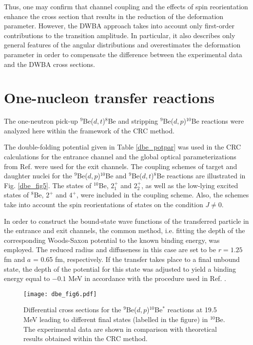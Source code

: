 \documentclass[
12pt, %
oneside, %
english, %
onehalfspacing, %
onehalfspacing, %
headsepline, %
]{MastersDoctoralThesis} %
\begin{document}
Thus, one may confirm that channel coupling and the effects of spin reorientation enhance the cross section that results in the reduction of the deformation parameter. However, the DWBA approach takes into account only first-order contributions to the transition amplitude. In particular, it also describes only general features of the angular distributions and overestimates the deformation parameter in order to compensate the difference between the experimental data and the DWBA cross sections.

\section{One-nucleon transfer reactions }

The one-neutron pick-up ${}^9$Be($d,t$)${}^8$Be and stripping ${}^9$Be($d,p$)${}^{10}$Be reactions were analyzed here within the framework of  the CRC method.

The double-folding potential given in Table \ref{dbe_potpar} was used in the CRC calculations for the entrance channel and the global optical parameterizations from Ref. \cite{globalProton, globalTriton} were used for the exit channels. The coupling schemes of target and daughter nuclei for the ${}^9$Be($d,p$)${}^{10}$Be and ${}^9$Be($d,t$)${}^8$Be  reactions  are illustrated in Fig. \ref{dbe_fig5}. The states of ${}^{10}$Be, $2^+_{1}$ and $2^+_{2}$, as well as the low-lying excited states of ${}^8$Be, $2^+$ and $4^+$, were included in the coupling scheme. Also, the schemes take into account the spin reorientations of states on the condition $J \neq 0$.

In order to construct the bound-state wave functions of the transferred particle in the entrance and exit channels, the common method, i.e. fitting the depth of the corresponding Woods-Saxon potential to the known binding energy, was employed. The reduced radius and diffuseness in this case are set to be $r = 1.25$ fm and $a$ = 0.65 fm, respectively. If the transfer takes place to a final unbound state, the depth of the potential for this state was adjusted to yield a binding energy equal to $-0.1$ MeV in accordance with the procedure used in Ref. \cite{harakeh1980strong}.

\begin{figure}[tp]
\centering
\texttt{[image: dbe\_fig6.pdf]}
\decoRule
\caption{\label{dbe_fig6} \footnotesize Differential cross sections for the ${}^9$Be($d,p$)${}^{10}$Be$^*$ reactions at 19.5 MeV leading to different final states (labelled in the figure) in ${}^{10}$Be. The experimental data are shown in comparison with theoretical results obtained within the CRC method.}
\end{figure}
\end{document}
